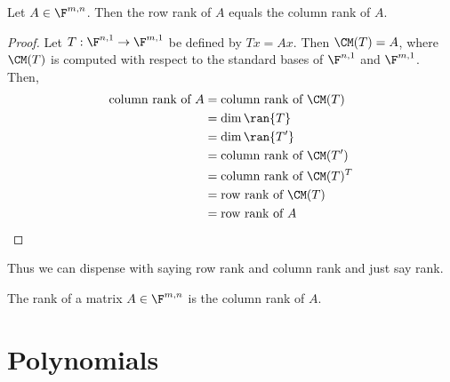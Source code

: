 \documentclass{article}
\begin{document}
  \begin{prop}
    Let $A \in \F^{m, n}$. Then the row rank of $A$ equals the column rank of $A$.
  \end{prop}
  \begin{proof}
    Let $T: \F^{n, 1} \to \F^{m, 1}$ be defined by $Tx = Ax$. Then $\CM(T) = A$, where $\CM(T)$ is computed with respect to the standard bases of $\F^{n, 1}$ and $\F^{m, 1}$. Then,
    \begin{align*}
      \text{column rank of }A & = \text{column rank of }\CM(T) \\
      & = \dim\ran{T} \\
      & = \dim\ran{T^{\prime}} \\
      & = \text{column rank of }\CM(T^{\prime}) \\
      & = \text{column rank of }\CM(T)^T \\
      & = \text{row rank of }\CM(T) \\
      & = \text{row rank of }A 
    \end{align*}
  \end{proof}
  Thus we can dispense with saying row rank and column rank and just say rank.
  \begin{prop}[rank]
    The rank of a matrix $A \in \F^{m, n}$ is the column rank of $A$.
  \end{prop}
\section{Polynomials}
\end{document}
